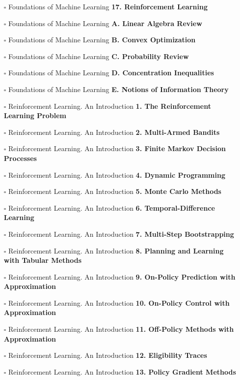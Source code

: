 \documentclass[a4, landscape, 12pt]{article}
\newcommand{\checkbox}{$\square$}%
\begin{document}
\begin{itemize}
{}
\item [\checkbox]  Foundations of Machine Learning \textbf{ 17. Reinforcement Learning
}
\item [\checkbox]  Foundations of Machine Learning \textbf{ A. Linear Algebra Review
}
\item [\checkbox]  Foundations of Machine Learning \textbf{ B. Convex Optimization
}
\item [\checkbox]  Foundations of Machine Learning \textbf{ C. Probability Review
}
\item [\checkbox]  Foundations of Machine Learning \textbf{ D. Concentration Inequalities
}
\item [\checkbox]  Foundations of Machine Learning \textbf{ E. Notions of Information Theory
}
\item [\checkbox]  Reinforcement Learning. An Introduction \textbf{ 1. The Reinforcement Learning Problem
}
\item [\checkbox]  Reinforcement Learning. An Introduction \textbf{ 2. Multi-Armed Bandits
}
\item [\checkbox]  Reinforcement Learning. An Introduction \textbf{ 3. Finite Markov Decision Processes
}
\item [\checkbox]  Reinforcement Learning. An Introduction \textbf{ 4. Dynamic Programming
}
\item [\checkbox]  Reinforcement Learning. An Introduction \textbf{ 5. Monte Carlo Methods
}
\item [\checkbox]  Reinforcement Learning. An Introduction \textbf{ 6. Temporal-Difference Learning
}
\item [\checkbox]  Reinforcement Learning. An Introduction \textbf{ 7. Multi-Step Bootstrapping
}
\item [\checkbox]  Reinforcement Learning. An Introduction \textbf{ 8. Planning and Learning with Tabular Methods
}
\item [\checkbox]  Reinforcement Learning. An Introduction \textbf{ 9. On-Policy Prediction with Approximation
}
\item [\checkbox]  Reinforcement Learning. An Introduction \textbf{ 10. On-Policy Control with Approximation
}
\item [\checkbox]  Reinforcement Learning. An Introduction \textbf{ 11. Off-Policy Methods with Approximation
}
\item [\checkbox]  Reinforcement Learning. An Introduction \textbf{ 12. Eligibility Traces
}
\item [\checkbox]  Reinforcement Learning. An Introduction \textbf{ 13. Policy Gradient Methods
}
\end{itemize}
\end{document}
